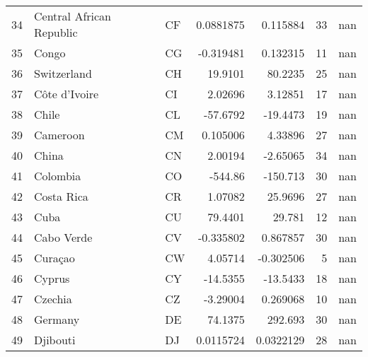 \begin{tabular}{rllrrrr}
 34 & Central African Republic         & CF         &    0.0881875  &     0.115884  &     33 &     nan      \\
 35 & Congo                            & CG         &   -0.319481   &     0.132315  &     11 &     nan      \\
 36 & Switzerland                      & CH         &   19.9101     &    80.2235    &     25 &     nan      \\
 37 & Côte d’Ivoire                    & CI         &    2.02696    &     3.12851   &     17 &     nan      \\
 38 & Chile                            & CL         &  -57.6792     &   -19.4473    &     19 &     nan      \\
 39 & Cameroon                         & CM         &    0.105006   &     4.33896   &     27 &     nan      \\
 40 & China                            & CN         &    2.00194    &    -2.65065   &     34 &     nan      \\
 41 & Colombia                         & CO         & -544.86       &  -150.713     &     30 &     nan      \\
 42 & Costa Rica                       & CR         &    1.07082    &    25.9696    &     27 &     nan      \\
 43 & Cuba                             & CU         &   79.4401     &    29.781     &     12 &     nan      \\
 44 & Cabo Verde                       & CV         &   -0.335802   &     0.867857  &     30 &     nan      \\
 45 & Curaçao                          & CW         &    4.05714    &    -0.302506  &      5 &     nan      \\
 46 & Cyprus                           & CY         &  -14.5355     &   -13.5433    &     18 &     nan      \\
 47 & Czechia                          & CZ         &   -3.29004    &     0.269068  &     10 &     nan      \\
 48 & Germany                          & DE         &   74.1375     &   292.693     &     30 &     nan      \\
 49 & Djibouti                         & DJ         &    0.0115724  &     0.0322129 &     28 &     nan      \\
\hline
\end{tabular}